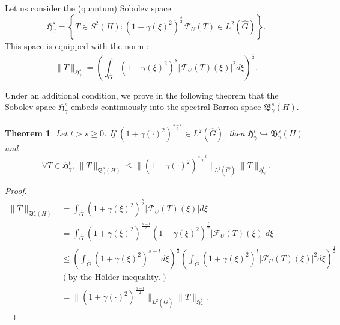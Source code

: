 \documentclass[11pt,a4paper]{amsart}
\newtheorem{theorem}{Theorem}[section]
\begin{document}
Let us consider the (quantum) Sobolev space $$\mathfrak{H}^s_\gamma=\left\{T\in S^2(H) : (1+\gamma(\xi)^2)^{\frac{s}{2}}\mathcal{F}_U(T)\in L^2(\widehat{G})\right\}.$$   This space is equipped with the norm :
\begin{equation}
\|T\|_{\mathfrak{H}^s_\gamma}=\left( \int_{\widehat{G}}(1+\gamma(\xi)^2)^s|\mathcal{F}_U(T)(\xi)|^2d\xi \right)^{\frac{1}{2}}.
\end{equation} 

Under an additional condition, we prove in the following theorem that the  Sobolev space $\mathfrak{H}^s_\gamma$ embeds continuously into the spectral Barron space $\mathfrak{B}^s_\gamma(H)$. 

\begin{theorem} 
Let $t>s \geq 0$. If $(1+\gamma(\cdot)^2)^{\frac{s-t}{2}}\in L^2(\widehat{G})$, then 
$\mathfrak{H}^t_\gamma\hookrightarrow \mathfrak{B}^s_\gamma(H)$ and 
$$\forall T\in \mathfrak{H}^t_\gamma,\,  \|T\|_{\mathfrak{B}^s_\gamma(H)}\leq \|(1+\gamma(\cdot)^2)^{\frac{s-t}{2}}\|_{L^2(\widehat{G})}\|T\|_{\mathfrak{H}^t_\gamma}.$$
\end{theorem}

\begin{proof}
\begin{align*}
\|T\|_{\mathfrak{B}^s_\gamma(H)}&=\int_{\widehat{G}}(1+\gamma(\xi)^2)^{\frac{s}{2}}|\mathcal{F}_U(T)(\xi)|d\xi\\
&=\int_{\widehat{G}}(1+\gamma(\xi)^2)^{\frac{s-t}{2}}(1+\gamma(\xi)^2)^{\frac{t}{2}}|\mathcal{F}_U(T)(\xi)|d\xi\\
&\leq \left(\int_{\widehat{G}}(1+\gamma(\xi)^2)^{s-t}d\xi\right)^{\frac{1}{2}}\left(\int_{\widehat{G}}(1+\gamma(\xi)^2)^{t}|\mathcal{F}_U(T)(\xi)|^2 d\xi\right)^{\frac{1}{2}}\\
&(\mbox{by the H\"older inequality.})\\
&=\|(1+\gamma(\cdot)^2)^{\frac{s-t}{2}}\|_{L^2(\widehat{G})}\|T\|_{\mathfrak{H}^t_\gamma}.
\end{align*}
\end{proof}
\end{document}

